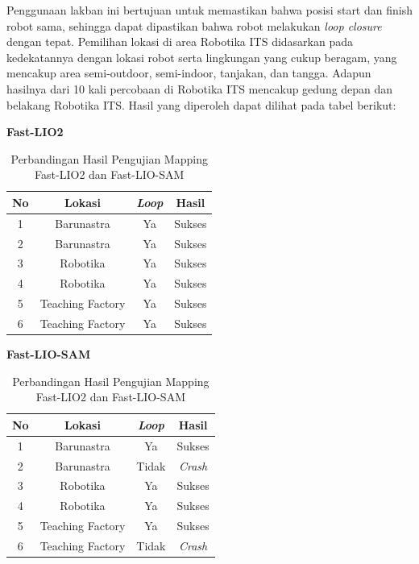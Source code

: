Penggunaan lakban ini bertujuan untuk memastikan bahwa posisi start dan finish robot
sama, sehingga dapat dipastikan bahwa robot melakukan \emph{loop closure} dengan
tepat. Pemilihan lokasi di area Robotika ITS didasarkan pada kedekatannya dengan
lokasi robot serta lingkungan yang cukup beragam, yang mencakup area semi-outdoor,
semi-indoor, tanjakan, dan tangga. Adapun hasilnya dari 10 kali percobaan di Robotika
ITS mencakup gedung depan dan belakang Robotika ITS. Hasil yang diperoleh dapat
dilihat pada tabel berikut:

\begin{table}[H]
	\centering
	\caption{Perbandingan Hasil Pengujian Mapping Fast-LIO2 dan Fast-LIO-SAM}
	\label{tab:perbandingan_mapping}
	\begin{minipage}{0.48\textwidth}
		\centering
		\textbf{Fast-LIO2} \\
		\vspace{0.2cm}
		\begin{tabular}{|c|c|c|c|}
			\hline
			\textbf{No} & \textbf{Lokasi}  & \textbf{\emph{Loop}} & \textbf{Hasil} \\
			\hline
			1           & Barunastra       & Ya                   & Sukses         \\
			2           & Barunastra       & Ya                   & Sukses         \\
			3           & Robotika         & Ya                   & Sukses         \\
			4           & Robotika         & Ya                   & Sukses         \\
			5           & Teaching Factory & Ya                   & Sukses         \\
			6           & Teaching Factory & Ya                   & Sukses         \\
			\hline
		\end{tabular}
	\end{minipage}
	\hfill
	\begin{minipage}{0.48\textwidth}
		\centering
		\textbf{Fast-LIO-SAM} \\
		\vspace{0.2cm}
		\begin{tabular}{|c|c|c|c|}
			\hline
			\textbf{No} & \textbf{Lokasi}  & \textbf{\emph{Loop}} & \textbf{Hasil} \\
			\hline
			1           & Barunastra       & Ya                   & Sukses         \\
			2           & Barunastra       & Tidak                & \emph{Crash}   \\
			3           & Robotika         & Ya                   & Sukses         \\
			4           & Robotika         & Ya                   & Sukses         \\
			5           & Teaching Factory & Ya                   & Sukses         \\
			6           & Teaching Factory & Tidak                & \emph{Crash}   \\
			\hline
		\end{tabular}
	\end{minipage}
\end{table}


